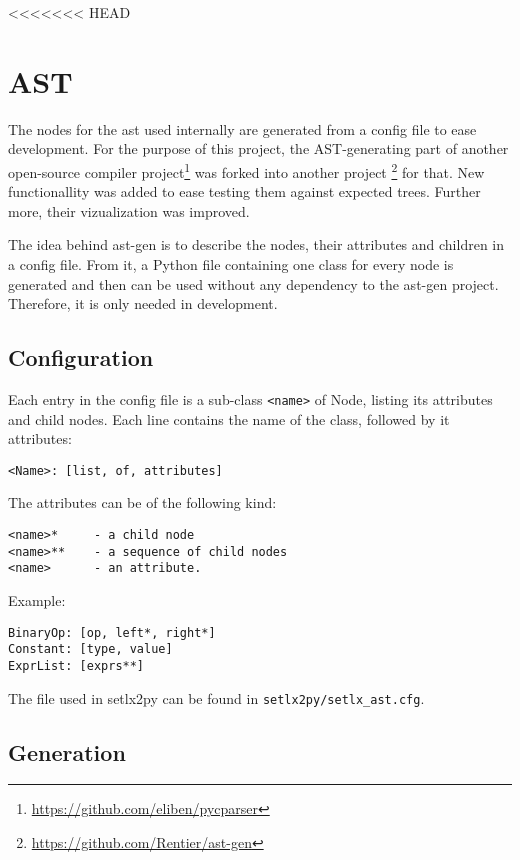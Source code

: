 <<<<<<< HEAD

\section{AST}
\label{sec:ast}

The nodes for the \gls{ast} used  internally are generated from a config file to ease development. For the purpose of this project, the AST-generating part of another open-source compiler project\footnote{\url{https://github.com/eliben/pycparser}}  was forked into another project \footnote{\url{https://github.com/Rentier/ast-gen}} for that. New functionallity was added to ease testing them against expected trees.  Further more, their vizualization was improved.

The idea behind ast-gen is to describe the nodes, their attributes and children in a config file. From it, a Python file containing one class for every node is generated and then can be used without any dependency to the ast-gen project. Therefore, it is only needed in development.

\subsection{Configuration}

Each entry in the config file is a sub-class \texttt{<name>} of Node, listing its attributes and child nodes. Each line contains the name of the class, followed by it attributes:

\verb$<Name>: [list, of, attributes]$

The attributes can be of the following kind:

\begin{verbatim}
<name>*     - a child node
<name>**    - a sequence of child nodes
<name>      - an attribute.
\end{verbatim}

Example:

\begin{verbatim}
BinaryOp: [op, left*, right*]
Constant: [type, value]
ExprList: [exprs**]
\end{verbatim}

The file used in setlx2py can be found in \texttt{setlx2py/setlx_ast.cfg}.

\subsection{Generation}

